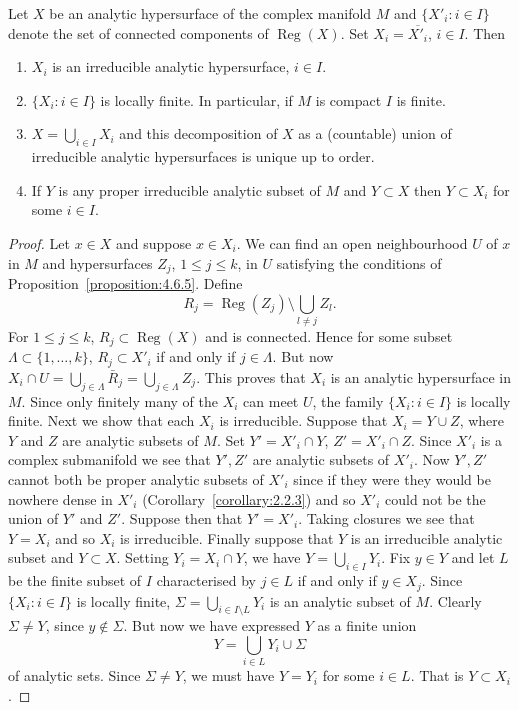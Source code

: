  Let $X$ be an analytic hypersurface of the complex manifold $M$ and $\{X'_i:i\in I\}$ denote the set of connected components of $\operatorname{Reg}(X)$. Set $X_i=\overline{X'_i}$, $i\in I$. Then
\begin{enumerate}
\item $X_i$ is an irreducible analytic hypersurface, $i\in I$.
\item $\{X_i:i\in I\}$ is locally finite. In particular, if $M$ is compact $I$ is finite.
\item $X=\bigcup_{i\in I}X_i$ and this decomposition of $X$ as a (countable) union of irreducible analytic hypersurfaces is unique up to order.
\item If $Y$ is any proper irreducible analytic subset of $M$ and $Y\subset X$ then $Y\subset X_i$ for some $i\in I$.
\end{enumerate}
\begin{proof}
Let $x\in X$ and suppose $x\in X_i$. We can find an open neighbourhood $U$ of $x$ in $M$ and hypersurfaces $Z_j$, $1\leq j\leq k$, in $U$ satisfying the conditions of Proposition~\ref{proposition:4.6.5}. Define
\[
R_j=\operatorname{Reg}(Z_j)\setminus\bigcup_{l\neq j}Z_l.
\]
For $1\leq j\leq k$, $R_j\subset\operatorname{Reg}(X)$ and is connected. Hence for some subset $\Lambda\subset\{1,\ldots,k\}$, $R_j\subset X'_i$ if and only if $j\in\Lambda$. But now $X_i\cap U=\bigcup_{j\in\Lambda}\bar R_j=\bigcup_{j\in\Lambda}Z_j$. This proves that $X_i$ is an analytic hypersurface in $M$. Since only finitely many of the $X_i$ can meet $U$, the family $\{X_i:i\in I\}$ is locally finite. Next we show that each $X_i$ is irreducible. Suppose that $X_i=Y\cup Z$, where $Y$ and $Z$ are analytic subsets of $M$. Set $Y'=X'_i\cap Y$, $Z'=X'_i\cap Z$. Since $X'_i$ is a complex submanifold we see that $Y',Z'$ are analytic subsets of $X'_i$. Now $Y',Z'$ cannot both be proper analytic subsets of $X'_i$ since if they were they would be nowhere dense in $X'_i$ (Corollary~\ref{corollary:2.2.3}) and so $X'_i$ could not be the union of $Y'$ and $Z'$. Suppose then that $Y'=X'_i$. Taking closures we see that $Y=X_i$ and so $X_i$ is irreducible.
Finally suppose that $Y$ is an irreducible analytic subset and $Y\subset X$. Setting $Y_i=X_i\cap Y$, we have $Y=\bigcup_{i\in I}Y_i$. Fix $y\in Y$ and let $L$ be the finite subset of $I$ characterised by $j\in L$ if and only if $y\in X_j$. Since $\{X_i:i\in I\}$ is locally finite, $\Sigma=\bigcup_{i\in I\setminus L}Y_i$ is an analytic subset of $M$. Clearly $\Sigma\neq Y$, since $y\notin\Sigma$. But now we have expressed $Y$ as a finite union
\[
Y=\bigcup_{i\in L}Y_i\cup\Sigma
\]
of analytic sets. Since $\Sigma\neq Y$, we must have $Y=Y_i$ for some $i\in L$. That is $Y\subset X_i$.
\end{proof}

